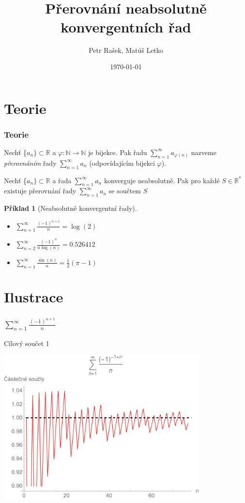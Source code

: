 \documentclass{beamer}
\title[Přerovnání řad]{Přerovnání neabsolutně konvergentních řad}
\author{Petr Rašek, Matúš Letko}
\institute[Charles University]{Charles University, Czech Republic}
\date{\today}
\newtheorem{exercise}[theorem]{Příklad}
\begin{document}
\begin{frame}
\titlepage

\end{frame}

\section{Teorie}
\label{sec:introduction}


\begin{frame}
  \frametitle{Teorie}
  \begin{Definition}
  Nechť \{\(a_n\} \subset \mathbb{R}\) a \(\varphi : \mathbb{N} \rightarrow \mathbb{N}\) je bijekce. Pak řadu 
  \(\sum _{n=1} ^{\infty} a_{\varphi(n)}\) nazveme \textit{přerovnáním} řady \(\sum _{n=1} ^{\infty} a_n\) (odpovídajícím bijekci \(\varphi\)).
  \end{Definition}
  \begin{Theorem}[Riemannova] 
  \normalfont Nechť \{\(a_n\} \subset \mathbb{R}\) a řada \(\sum _{n=1} ^{\infty} a_n\) konverguje neabsolutně. Pak pro každé \(S \in \mathbb{R} ^\ast\) existuje přerovnání řady \(\sum _{n=1} ^{\infty} a_n\) se součtem \(S\)
  \end{Theorem}
  \begin{exercise}[Neabsolutně konvergentní řady]
    \begin{itemize}
        \item \(\sum _{n=1} ^{\infty} \frac{(-1)^{n+1}}{n} = \log(2)\)
        \item \(\sum _{n=2} ^{\infty} \frac{(-1)^{n}}{n\log(n)} = 0.526412\)
        \item \(\sum _{n=1} ^{\infty} \frac{\sin(n)}{n} = \frac{1}{2}(\pi - 1)\)
    \end{itemize}
  \end{exercise}
\end{frame}

\section{Ilustrace}
\begin{frame}
  \frametitle{\(\sum _{n=1} ^{\infty} \frac{(-1)^{n+1}}{n}\)}
  Cílový součet 1
  \begin{center}
    \includegraphics[width=0.8\textwidth]{serie1_1.png}
  \end{center}
\end{frame}
\end{document}
